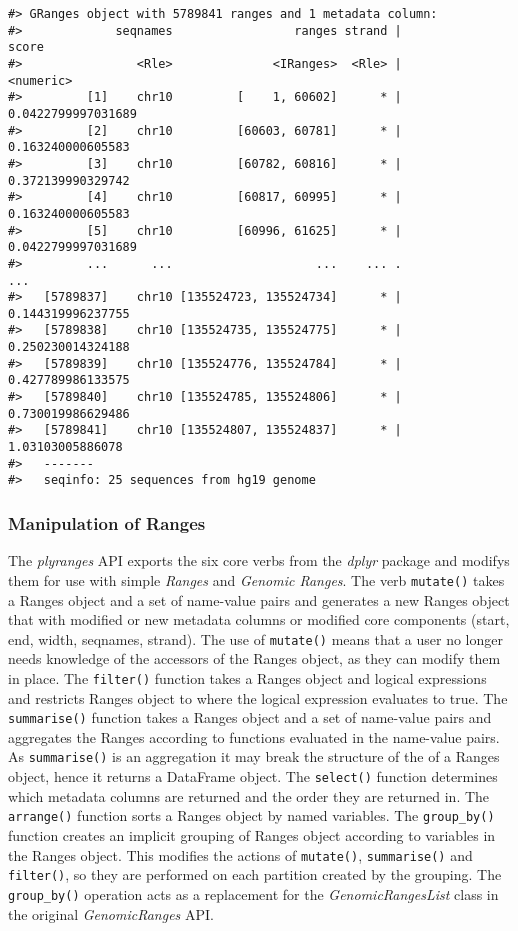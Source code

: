 \documentclass[10pt,letterpaper]{article}
\begin{document}
\begin{verbatim}
#> GRanges object with 5789841 ranges and 1 metadata column:
#>             seqnames                 ranges strand |              score
#>                <Rle>              <IRanges>  <Rle> |          <numeric>
#>         [1]    chr10         [    1, 60602]      * | 0.0422799997031689
#>         [2]    chr10         [60603, 60781]      * |  0.163240000605583
#>         [3]    chr10         [60782, 60816]      * |  0.372139990329742
#>         [4]    chr10         [60817, 60995]      * |  0.163240000605583
#>         [5]    chr10         [60996, 61625]      * | 0.0422799997031689
#>         ...      ...                    ...    ... .                ...
#>   [5789837]    chr10 [135524723, 135524734]      * |  0.144319996237755
#>   [5789838]    chr10 [135524735, 135524775]      * |  0.250230014324188
#>   [5789839]    chr10 [135524776, 135524784]      * |  0.427789986133575
#>   [5789840]    chr10 [135524785, 135524806]      * |  0.730019986629486
#>   [5789841]    chr10 [135524807, 135524837]      * |   1.03103005886078
#>   -------
#>   seqinfo: 25 sequences from hg19 genome
\end{verbatim}

\hypertarget{manipulation-of-ranges}{%
\subsubsection{Manipulation of Ranges}\label{manipulation-of-ranges}}

The \emph{plyranges} API exports the six core verbs from the
\emph{dplyr} package and modifys them for use with simple \emph{Ranges}
and \emph{Genomic Ranges}. The verb \texttt{mutate()} takes a Ranges
object and a set of name-value pairs and generates a new Ranges object
that with modified or new metadata columns or modified core components
(start, end, width, seqnames, strand). The use of \texttt{mutate()}
means that a user no longer needs knowledge of the accessors of the
Ranges object, as they can modify them in place. The \texttt{filter()}
function takes a Ranges object and logical expressions and restricts
Ranges object to where the logical expression evaluates to true. The
\texttt{summarise()} function takes a Ranges object and a set of
name-value pairs and aggregates the Ranges according to functions
evaluated in the name-value pairs. As \texttt{summarise()} is an
aggregation it may break the structure of the of a Ranges object, hence
it returns a DataFrame object. The \texttt{select()} function determines
which metadata columns are returned and the order they are returned in.
The \texttt{arrange()} function sorts a Ranges object by named
variables. The \texttt{group\_by()} function creates an implicit
grouping of Ranges object according to variables in the Ranges object.
This modifies the actions of \texttt{mutate()}, \texttt{summarise()} and
\texttt{filter()}, so they are performed on each partition created by
the grouping. The \texttt{group\_by()} operation acts as a replacement
for the \emph{GenomicRangesList} class in the original
\emph{GenomicRanges} API.
\end{document}
